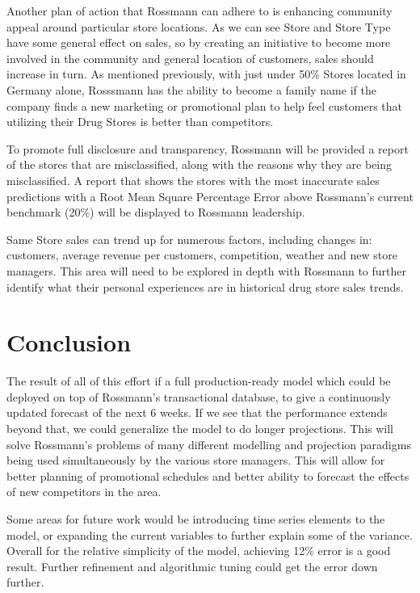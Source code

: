 \documentclass[DIV=calc, paper=a4, fontsize=11pt]{scrartcl}	 %
\begin{document}
Another plan of action that Rossmann can adhere to is enhancing community appeal 
around particular store locations. As we can see Store and Store Type have some general effect 
on sales, so by creating an initiative to become more involved in the community and general 
location of customers, sales should increase in turn. As mentioned previously, with just under 
50\% Stores located in Germany alone, Rosssmann has the ability to become a family name if 
the company finds a new marketing or promotional plan to help feel customers that utilizing 
their Drug Stores is better than competitors.

To promote full disclosure and transparency, Rossmann will be provided a report of the stores that are misclassified, along with the reasons why they are being misclassified. A report that shows the stores with the most inaccurate sales predictions with a Root Mean Square Percentage Error above Rossmann’s current benchmark (20\%) will be displayed to Rossmann leadership.

Same Store sales can trend up for numerous factors, including changes in: customers, average revenue per customers, competition, weather and new store managers. This area will need to be explored in depth with Rossmann to further identify what their personal experiences are in historical drug store sales trends.


\section*{Conclusion}

The result of all of this effort if a full production-ready model which could be deployed on top of Rossmann's transactional database, to give a continuously updated forecast of the next 6 weeks. If we see that the performance extends beyond that, we could generalize the model to do longer projections. This will solve Rossmann's problems of many different modelling and projection paradigms being used simultaneously by the various store managers. This will allow for better planning of promotional schedules and better ability to forecast the effects of new competitors in the area.

Some areas for future work would be introducing time series elements to the model, or expanding the current variables to further explain some of the variance. Overall for the relative simplicity of the model, achieving 12\% error is a good result. Further refinement and algorithmic tuning could get the error down further.
\end{document}
